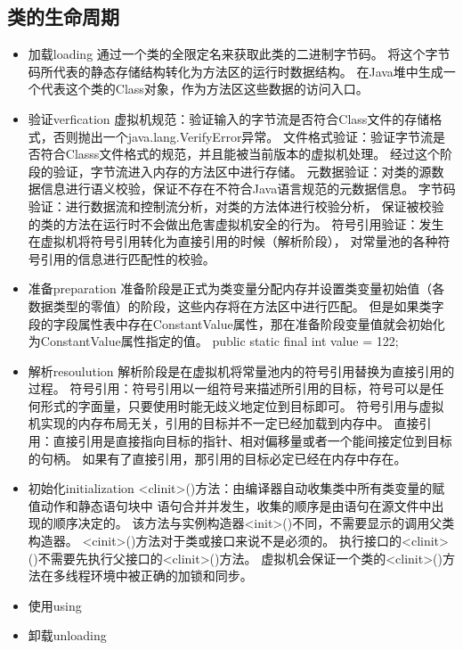 \subsection{类的生命周期}
\begin{itemize}
	\item 加载loading
	\subitem 通过一个类的全限定名来获取此类的二进制字节码。
	\subitem 将这个字节码所代表的静态存储结构转化为方法区的运行时数据结构。
	\subitem 在Java堆中生成一个代表这个类的Class对象，作为方法区这些数据的访问入口。
	\item 验证verfication
	\subitem 虚拟机规范：验证输入的字节流是否符合Class文件的存储格式，否则抛出一个java.lang.VerifyError异常。
	\subitem 文件格式验证：验证字节流是否符合Classs文件格式的规范，并且能被当前版本的虚拟机处理。
	经过这个阶段的验证，字节流进入内存的方法区中进行存储。
	\subitem 元数据验证：对类的源数据信息进行语义校验，保证不存在不符合Java语言规范的元数据信息。
	\subitem 字节码验证：进行数据流和控制流分析，对类的方法体进行校验分析，
	保证被校验的类的方法在运行时不会做出危害虚拟机安全的行为。
	\subitem 符号引用验证：发生在虚拟机将符号引用转化为直接引用的时候（解析阶段），
	对常量池的各种符号引用的信息进行匹配性的校验。
	\item 准备preparation
	\subitem 准备阶段是正式为类变量分配内存并设置类变量初始值（各数据类型的零值）的阶段，这些内存将在方法区中进行匹配。
	但是如果类字段的字段属性表中存在ConstantValue属性，那在准备阶段变量值就会初始化为ConstantValue属性指定的值。
	\subitem public static final int value = 122;
	\item 解析resoulution
	\subitem 解析阶段是在虚拟机将常量池内的符号引用替换为直接引用的过程。
	\subitem 符号引用：符号引用以一组符号来描述所引用的目标，符号可以是任何形式的字面量，只要使用时能无歧义地定位到目标即可。
	符号引用与虚拟机实现的内存布局无关，引用的目标并不一定已经加载到内存中。
	\subitem 直接引用：直接引用是直接指向目标的指针、相对偏移量或者一个能间接定位到目标的句柄。
	如果有了直接引用，那引用的目标必定已经在内存中存在。
	\item 初始化initialization
	\subitem <clinit>()方法：由编译器自动收集类中所有类变量的赋值动作和静态语句块中
	语句合并并发生，收集的顺序是由语句在源文件中出现的顺序决定的。
	\subitem 该方法与实例构造器<init>()不同，不需要显示的调用父类构造器。
	\subitem <cinit>()方法对于类或接口来说不是必须的。
	\subitem 执行接口的<clinit>()不需要先执行父接口的<clinit>()方法。
	\subitem 虚拟机会保证一个类的<clinit>()方法在多线程环境中被正确的加锁和同步。
	\item 使用using
	\item 卸载unloading
\end{itemize}
